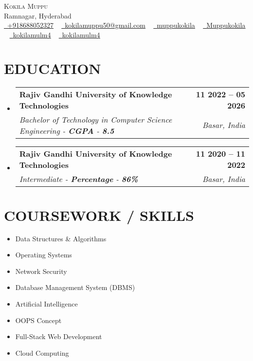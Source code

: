 \documentclass[letterpaper,11pt]{article}
\makeatletter
\newcommand{\resumeSubheading}[4]{
	\vspace{-2pt}\item
	\begin{tabular*}{1.0\textwidth}[t]{l@{\extracolsep{\fill}}r}
		\textbf{\large#1} & \textbf{\small #2} \\
		\textit{\large#3} & \textit{\small #4} \\
	\end{tabular*}\vspace{-7pt}
}
\newcommand{\resumeSubHeadingListStart}{\begin{itemize}[leftmargin=0.0in, label={}]}
\newcommand{\resumeSubHeadingListEnd}{\end{itemize}}
\makeatother
\begin{document}
	
	\begin{center}
		{\Huge \scshape Kokila Muppu} \\ \vspace{1pt}
		Ramnagar, Hyderabad \\ \vspace{1pt}
		\small \href{tel:+918688052327}{ \raisebox{-0.1\height}\faPhone\ \underline{+918688052327}} ~ \href{mailto:kokilamuppu50@gmail.com}{\raisebox{-0.2\height}\faEnvelope\ \underline{kokilamuppu50@gmail.com}} ~
		\href{https://www.linkedin.com/in/muppukokila}{\raisebox{-0.2\height}\faLinkedinSquare\ \underline{muppukokila}} ~
		\href{https://github.com/Muppukokila}{\raisebox{-0.2\height}\faGithub\ \underline{Muppukokila}} ~
		\href{https://leetcode.com/u/Kokila123/}{ \ \underline{kokilamulm4}} ~
		\href{https://www.geeksforgeeks.org/user/kokilamu1m4/}{ \ \underline{kokilamulm4}}
		\vspace{-8pt}
	\end{center}
	
	\section{EDUCATION}
	\resumeSubHeadingListStart
	\resumeSubheading
	{Rajiv Gandhi University of Knowledge Technologies}{11 2022 -- 05 2026}
	{Bachelor of Technology in Computer Science Engineering - \textbf{CGPA} - \textbf{8.5}}{Basar, India}
	\resumeSubHeadingListEnd
	\resumeSubHeadingListStart
	\resumeSubheading
	{Rajiv Gandhi University of Knowledge Technologies}{11 2020 -- 11 2022}
	{Intermediate - \textbf{Percentage} - \textbf{86\%}}{Basar, India}
	\resumeSubHeadingListEnd
	
	\section{COURSEWORK / SKILLS}
	\begin{multicols}{4}
		\begin{itemize}[itemsep=-2pt, parsep=5pt]
			\item Data Structures \& Algorithms
			\item Operating Systems
			\item Network Security
			\item Database Management System (DBMS)
			\item Artificial Intelligence
			\item OOPS Concept
			\item Full-Stack Web Development
			\item Cloud Computing
		\end{itemize}
	\end{multicols}
	\vspace*{2.0\multicolsep}
	
\end{document}
